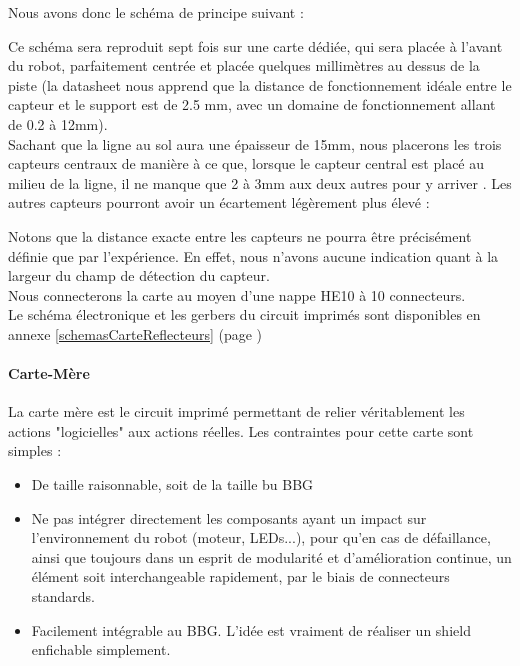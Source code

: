 			Nous avons donc le schéma de principe suivant :

			Ce schéma sera reproduit sept fois sur une carte dédiée, qui sera placée à l'avant du robot, parfaitement centrée et placée quelques millimètres au dessus de la piste (la datasheet nous apprend que la distance de fonctionnement idéale entre le capteur et le support est de 2.5 mm, avec un domaine de fonctionnement allant de 0.2 à 12mm).\\
			
			Sachant que la ligne au sol aura une épaisseur de 15mm, nous placerons les trois capteurs centraux de manière à ce que, lorsque le capteur central est placé au milieu de la ligne, il ne manque que 2 à 3mm aux deux autres pour y arriver . Les autres capteurs pourront avoir un écartement légèrement plus élevé :


			Notons que la distance exacte entre les capteurs ne pourra être précisément définie que par l'expérience. En effet, nous n'avons aucune indication quant à la largeur du champ de détection du capteur.\\

			Nous connecterons la carte au moyen d'une nappe HE10 à 10 connecteurs.\\

			Le schéma électronique et les gerbers du circuit imprimés sont disponibles en annexe \ref{schemasCarteReflecteurs} (page \pageref{schemasCarteReflecteurs})

		\paragraph{Carte-Mère}\label{carteMere}

			La carte mère est le circuit imprimé permettant de relier véritablement les actions "logicielles" aux actions réelles. Les contraintes pour cette carte sont simples :
			\begin{itemize}
				\item De taille raisonnable, soit de la taille bu BBG
				\item Ne pas intégrer directement les composants ayant un impact sur l'environnement du robot (moteur, LEDs...), pour qu'en cas de défaillance, ainsi que toujours dans un esprit de modularité et d'amélioration continue, un élément soit interchangeable rapidement, par le biais de connecteurs standards.
				\item Facilement intégrable au BBG. L'idée est vraiment de réaliser un shield enfichable simplement.
			\end{itemize}
			

